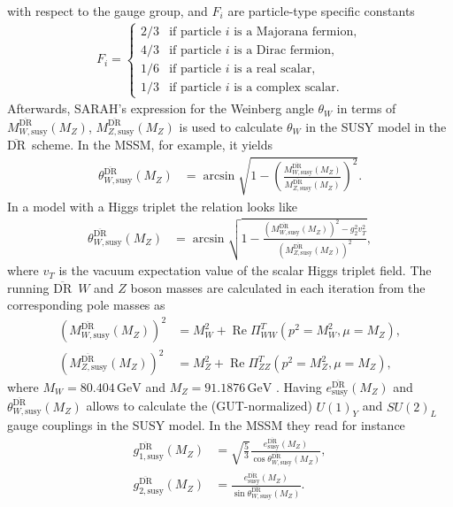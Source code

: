 \documentclass[final,3p,11pt,pdflatex]{elsarticle}
\newcommand{\textoverline}[1]{$\overline{\mbox{#1}}$}
\newcommand{\DRbar}{\textoverline{DR}\xspace}
\newcommand{\unit}[1]{\,\text{#1}}      %
\DeclareMathOperator{\re}{Re}
\begin{document}
with respect to the gauge group, and $F_i$ are particle-type specific
constants \cite{Hall:1980kf}
%
\begin{align}
  F_i =
  \begin{cases}
    2/3 & \text{if particle $i$ is a Majorana fermion},\\
    4/3 & \text{if particle $i$ is a Dirac fermion},\\
    1/6 & \text{if particle $i$ is a real scalar},\\
    1/3 & \text{if particle $i$ is a complex scalar}.
  \end{cases}
\end{align}
%
Afterwards, SARAH's expression for the Weinberg angle $\theta_W$ in
terms of $M_{W,\text{susy}}^{\text{\DRbar}}(M_Z)$,
$M_{Z,\text{susy}}^{\text{\DRbar}}(M_Z)$ is used to calculate
$\theta_W$ in the SUSY model in the \DRbar\ scheme.  In the MSSM, for
example, it yields
%
\begin{align}
  \theta_{W,\text{susy}}^{\text{\DRbar}}(M_Z) &= \arcsin\sqrt{1
    -
    \left(\frac{M_{W,\text{susy}}^{\text{\DRbar}}(M_Z)}{M_{Z,\text{susy}}^{\text{\DRbar}}(M_Z)}\right)^2}
  .
\end{align}
%
In a model with a Higgs triplet the relation looks like
%
\begin{align}
  \theta_{W,\text{susy}}^{\text{\DRbar}}(M_Z) &= \arcsin\sqrt{1 -
    \frac{\left(M_{W,\text{susy}}^{\text{\DRbar}}(M_Z)\right)^2 -
      g_2^2v_T^2}{\left(M_{Z,\text{susy}}^{\text{\DRbar}}(M_Z)\right)^2}},
\end{align}
%
where $v_T$ is the vacuum expectation value of the scalar Higgs
triplet field.
The running \DRbar\ $W$ and $Z$ boson masses are calculated in each
iteration from the corresponding pole masses as
%
\begin{align}
  \left(M_{W,\text{susy}}^{\text{\DRbar}}(M_Z)\right)^2 &=
  M_W^2 + \re \Pi_{WW}^T(p^2 = M_W^2, \mu=M_Z) ,\\
  \left(M_{Z,\text{susy}}^{\text{\DRbar}}(M_Z)\right)^2 &=
  M_Z^2 + \re \Pi_{ZZ}^T(p^2 = M_Z^2, \mu=M_Z) ,
\end{align}
%
where $M_W = 80.404\unit{GeV}$ and $M_Z = 91.1876\unit{GeV}$
\cite{Beringer:1900zz}.  Having $e_{\text{susy}}^{\text{\DRbar}}(M_Z)$
and $\theta_{W,\text{susy}}^{\text{\DRbar}}(M_Z)$ allows to calculate
the (GUT-normalized) $U(1)_Y$ and $SU(2)_L$ gauge couplings in the
SUSY model.  In the MSSM they read for instance
%
\begin{align}
  g_{1,\text{susy}}^{\text{\DRbar}}(M_Z) &=
  \sqrt{\frac{5}{3}} \frac{e_{\text{susy}}^{\text{\DRbar}}(M_Z)}{\cos\theta_{W,\text{susy}}^{\text{\DRbar}}(M_Z)} ,\\
  g_{2,\text{susy}}^{\text{\DRbar}}(M_Z) &=
  \frac{e_{\text{susy}}^{\text{\DRbar}}(M_Z)}{\sin\theta_{W,\text{susy}}^{\text{\DRbar}}(M_Z)} .
\end{align}
\end{document}
